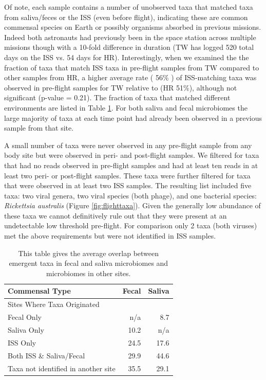 Of note, each sample contains a number of unobserved taxa that matched taxa from saliva/feces or the ISS (even before flight), indicating these are common commensal species on Earth or possibly organisms absorbed in previous missions. Indeed both astronauts had previously been in the space station across multiple missions though with a 10-fold difference in duration (TW has logged 520 total days on the ISS vs. 54 days for HR). Interestingly, when we examined the the fraction of taxa that match ISS taxa in pre-flight samples from TW compared to other samples from HR, a higher average rate ( 56\% ) of ISS-matching taxa was observed in pre-flight samples for TW relative to (HR  51\%), although not significant (p-value = 0.21). The fraction of taxa that matched different environments are listed in Table \ref{tbl:sourcepercents}. For both saliva and fecal microbiomes the large majority of taxa at each time point had already been observed in a previous sample from that site.  

A small number of taxa were never observed in any pre-flight sample from any body site but were observed in peri- and post-flight samples. We filtered for taxa that had no reads observed in pre-flight samples and had at least ten reads in at least two peri- or post-flight samples. These taxa were further filtered for taxa that were observed in at least two ISS samples. The resulting list included five taxa: two viral genera, two viral species (both phage), and one bacterial species: \textit{Rickettsia australis} (Figure \ref{fig:flighttaxa}). Given the generally low abundance of these taxa we cannot definitively rule out that they were present at an undetectable low threshold pre-flight. For comparison only 2 taxa (both viruses) met the above requirements but were not identified in ISS samples.
 
\begin{table}[]
\centering
\caption{This table gives the average overlap between emergent taxa in fecal and saliva microbiomes and microbiomes in other sites.}
\label{tbl:sourcepercents}
\begin{tabular}{lrr}
\toprule
Commensal Type &      Fecal &     Saliva \\
\midrule
Sites Where Taxa Originated     &            &            \\
Fecal Only       &  n/a &   8.7  \\
Saliva Only      &  10.2 &  n/a  \\
ISS Only        &  24.5 &  17.6 \\
Both ISS \& Saliva/Fecal        &  29.9 &  44.6 \\
Taxa not identified in another site &  35.5 &  29.1 \\
\bottomrule
\end{tabular}
\end{table}

